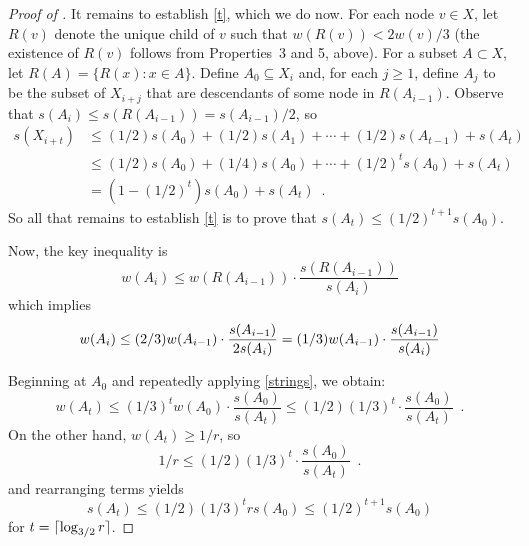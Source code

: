 \documentclass{patmorin}
\begin{document}
\begin{proof}[Proof of ]
  It remains to establish \eqref{t}, which we do now.  For each node
  $v\in X$, let $R(v)$ denote the unique child of $v$ such that $w(R(v))
  < 2w(v)/3$ (the existence of $R(v)$ follows from Properties~3 and
  5, above).  For a subset $A\subset X$, let $R(A)=\{R(x):x\in A\}$.
  Define $A_0\subseteq X_i$ and, for each $j\ge 1$, define $A_j$
  to be the subset of $X_{i+j}$ that are descendants of some node in
  $R(A_{i-1})$.  Observe that $s(A_i) \le s(R(A_{i-1})) = s(A_{i-1})/2$,
  so 
   \begin{align*}
      s(X_{i+t}) 
         &\le (1/2)s(A_0) + (1/2)s(A_1) + \cdots + (1/2)s(A_{t-1}) + s(A_t) \\
         &\le (1/2)s(A_0) + (1/4)s(A_0) + \cdots + (1/2)^t s(A_{0}) + s(A_t) \\
         &  = (1-(1/2)^t)s(A_0) + s(A_t) \enspace .
   \end{align*}
  So all that remains to establish \eqref{t} is to prove that 
  $s(A_t)\le (1/2)^{t+1}s(A_0)$.

  Now, the key inequality is 
  \begin{equation}
      w(A_i) \le w(R(A_{i-1}))\cdot\frac{s(R(A_{i-1}))}{s(A_i)}
  \end{equation}
  which implies
  \begin{equation}
       w(A_i) \le (2/3)w(A_{i-1})\cdot\frac{s(A_{i-1})}{2s(A_i)}
             = (1/3)w(A_{i-1})\cdot\frac{s(A_{i-1})}{s(A_i)}
             \eqlabel{strings}
  \end{equation}

  Beginning at $A_0$ and repeatedly applying \eqref{strings}, we obtain:
  \[
      w(A_t) \le (1/3)^t w(A_0)\cdot\frac{s(A_0)}{s(A_t)} 
             \le (1/2)(1/3)^t \cdot\frac{s(A_0)}{s(A_t)} \enspace .
  \]
  On the other hand, $w(A_t)\ge 1/r$, so  
  \[ 
      1/r \le (1/2)(1/3)^t\cdot\frac{s(A_0)}{s(A_t)} \enspace .
  \]
  and rearranging terms yields
  \[
     s(A_t) \le (1/2)(1/3)^t r s(A_0) \le (1/2)^{t+1}s(A_0)
  \]
  for $t = {\lceil \log_{3/2} r \rceil}$.
\end{proof}




\end{document}
